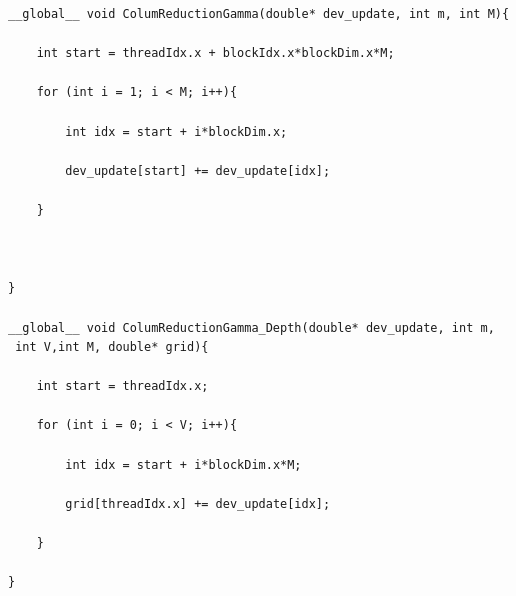 \documentclass[english, paper=a4]{scrartcl}
\begin{document}
\begin{verbatim}
__global__ void ColumReductionGamma(double* dev_update, int m, int M){

	int start = threadIdx.x + blockIdx.x*blockDim.x*M;

	for (int i = 1; i < M; i++){

		int idx = start + i*blockDim.x;

		dev_update[start] += dev_update[idx];

	}



}

__global__ void ColumReductionGamma_Depth(double* dev_update, int m,
 int V,int M, double* grid){

	int start = threadIdx.x;
	
	for (int i = 0; i < V; i++){

		int idx = start + i*blockDim.x*M;

		grid[threadIdx.x] += dev_update[idx];

	}

}
\end{verbatim}
\end{document}
